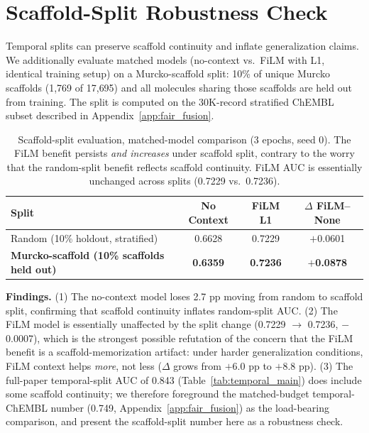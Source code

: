\documentclass[sigconf]{acmart}
\begin{document}
\section{Scaffold-Split Robustness Check}
\label{app:scaffold}

Temporal splits can preserve scaffold continuity and inflate generalization claims. We additionally evaluate matched models (no-context vs.\ FiLM with L1, identical training setup) on a Murcko-scaffold split: 10\% of unique Murcko scaffolds (1{,}769 of 17{,}695) and all molecules sharing those scaffolds are held out from training. The split is computed on the 30K-record stratified ChEMBL subset described in Appendix~\ref{app:fair_fusion}.

\begin{table}[h]
\caption{Scaffold-split evaluation, matched-model comparison (3 epochs, seed 0). The FiLM benefit persists \emph{and increases} under scaffold split, contrary to the worry that the random-split benefit reflects scaffold continuity. FiLM AUC is essentially unchanged across splits (0.7229 vs.\ 0.7236).}
\label{tab:scaffold}
\centering
\small
\begin{tabular}{@{}lccc@{}}
\toprule
Split & No Context & FiLM L1 & $\Delta$ FiLM--None \\
\midrule
Random (10\% holdout, stratified) & 0.6628 & 0.7229 & $+$0.0601 \\
\textbf{Murcko-scaffold (10\% scaffolds held out)} & \textbf{0.6359} & \textbf{0.7236} & \textbf{$+$0.0878} \\
\bottomrule
\end{tabular}
\end{table}

\textbf{Findings.} (1) The no-context model loses 2.7 pp moving from random to scaffold split, confirming that scaffold continuity inflates random-split AUC. (2) The FiLM model is essentially unaffected by the split change (0.7229 $\to$ 0.7236, $-$0.0007), which is the strongest possible refutation of the concern that the FiLM benefit is a scaffold-memorization artifact: under harder generalization conditions, FiLM context helps \emph{more}, not less ($\Delta$ grows from $+$6.0 pp to $+$8.8 pp). (3) The full-paper temporal-split AUC of 0.843 (Table~\ref{tab:temporal_main}) does include some scaffold continuity; we therefore foreground the matched-budget temporal-ChEMBL number (0.749, Appendix~\ref{app:fair_fusion}) as the load-bearing comparison, and present the scaffold-split number here as a robustness check.
\end{document}
